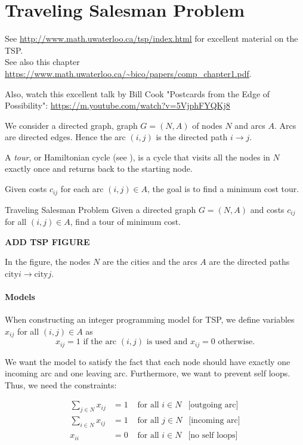 \documentclass[../open-optimization/open-optimization.tex]{subfiles}
\begin{document}
\section{Traveling Salesman Problem}
\label{sec:tsp-models}
See \url{http://www.math.uwaterloo.ca/tsp/index.html} for excellent material on the TSP.\\
See also this chapter \url{https://www.math.uwaterloo.ca/~bico/papers/comp_chapter1.pdf}.

Also, watch this excellent talk by Bill Cook "Postcards from the Edge of Possibility":
\url{https://m.youtube.com/watch?v=5VjphFYQKj8}

We consider a directed graph, graph $G = (N,A)$ of nodes $N$ and arcs $A$.   Arcs are directed edges.  Hence the arc $(i,j)$ is the directed path $i \to j$.

A \emph{tour}, or Hamiltonian cycle (see ), is a cycle that visits all the nodes in $N$ exactly once and returns back to the starting node.


Given costs $c_{ij}$ for each arc $(i,j) \in A$, the goal is to find a minimum cost tour.


\begin{general}{Traveling Salesman Problem}{\nphard}
Given a directed graph $G = (N,A)$ and costs $c_{ij}$ for all $(i,j) \in A$, find a tour of minimum cost.
\end{general}
\begin{center}
\textbf{ADD TSP FIGURE}
\end{center}
In the figure, the nodes $N$ are the cities and the arcs $A$ are the directed paths $\text{city} i \to \text{city} j$.

\paragraph{Models}
When constructing an integer programming model for TSP, we define variables $x_{ij}$ for all $(i,j) \in A$ as 
$$
x_{ij } = 1 \text{ if the arc $(i,j)$ is used  and   }  x_{ij} = 0 \text{   otherwise.}
$$

We want the model to satisfy the fact that each node should have exactly one incoming arc and one leaving arc.  Furthermore, we want to prevent self loops.  Thus, we need the constraints:

\begin{align}
\label{eq:tsp-part-model}
\sum_{j\in N} x_{ij} &= 1 & \text{ for all } i \in N \ \ \text{ [outgoing arc]}\\
\sum_{i \in N} x_{ij} &= 1 & \text{ for all } j \in N \ \ \text{ [incoming arc]}\\
\label{eq:tsp-part-model3}
x_{ii} &= 0 & \text{ for all } i \in N \ \ \text{ [no self loops]} 
\end{align}
\end{document}
